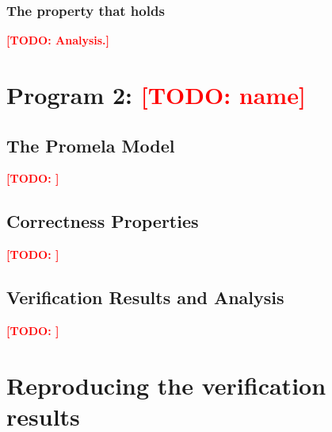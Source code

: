 \documentclass[11pt,a4paper]{article}
\newcommand{\todo}[1]{\textcolor{red}{\textbf{[TODO: #1]}}}
\begin{document}
\subsubsection*{The property that holds}


\todo{Analysis.}

\section{Program 2: \todo{name}}

\subsection{The Promela Model}
\todo{}

\subsection{Correctness Properties}
\todo{}

\subsection{Verification Results and Analysis}
\todo{}

\appendix
\section{Reproducing the verification results}
\end{document}
